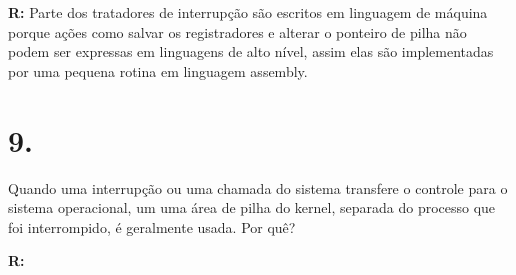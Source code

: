\documentclass{article}
\begin{document}
\medskip
\noindent
\textbf{R:} Parte dos tratadores de interrupção são escritos em linguagem de máquina porque ações como salvar os registradores e alterar o ponteiro de pilha não podem ser expressas em linguagens de alto nível, assim elas são implementadas por uma pequena rotina em linguagem assembly.

\section{9.}
Quando uma interrupção ou uma chamada do sistema transfere o controle para o sistema
operacional, um uma área de pilha do kernel, separada do processo que foi interrompido, é
geralmente usada. Por quê?

\medskip
\noindent
\textbf{R: } 
\end{document}
